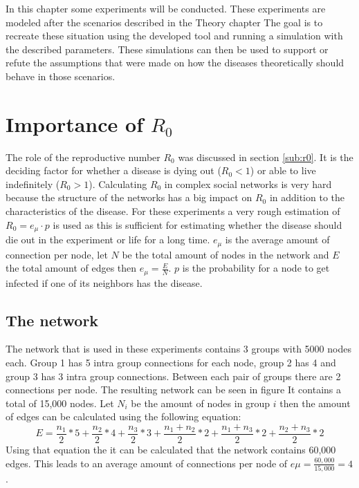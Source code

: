 In this chapter some experiments will be conducted. These experiments are modeled
after the scenarios described in the Theory chapter %
The goal is to recreate these situation using the developed tool and running a
simulation with the described parameters. These simulations can then be used
to support or refute the assumptions that were made on how the diseases
theoretically should behave in those scenarios.

\section{Importance of $R_0$}
The role of the reproductive number $R_0$ was discussed in section \ref{sub:r0}.
It is the deciding factor for whether a disease is dying out ($R_0 < 1$) 
or able to live indefinitely ($R_0 > 1$). Calculating $R_0$ in complex social
networks is very hard because the structure of the networks has a big impact on $R_0$
in addition to the characteristics of the disease. For these experiments a very
rough estimation of $R_0=e_\mu \cdot p$ is used as this is sufficient for estimating whether
the disease should die out in the experiment or life for a long time.
$e_\mu$ is the average amount of connection per node, let $N$ be the total
amount of nodes in the network and $E$ the total amount of edges then
$e_\mu=\frac{E}{N}$. $p$ is the probability for a node to get infected
if one of its neighbors has the disease.

\subsection{The network}
\label{sub:exp_network}
The network that is used in these experiments contains 3 groups with 5000 nodes
each. Group 1 has 5 intra group connections for each node, group 2 has 4 and
group 3 has 3 intra group connections. Between each pair of groups there are
2 connections per node. The resulting network can be seen in figure %
It contains a total of 15,000 nodes. Let $N_i$ be the amount of nodes in group $i$
then the amount of edges can be calculated using the following equation:
\begin{equation}
    E = \frac{n_1}{2} * 5 + \frac{n_2}{2} * 4 + \frac{n_3}{2} * 3 + \frac{n_1+n_2}{2} * 2 + \frac{n_1+n_3}{2} * 2 + \frac{n_2+n_3}{2} * 2
\end{equation}
Using that equation the it can be calculated that the network contains 60,000 edges.
This leads to an average amount of connections per node of $e\mu=\frac{60,000}{15,000} = 4$.

